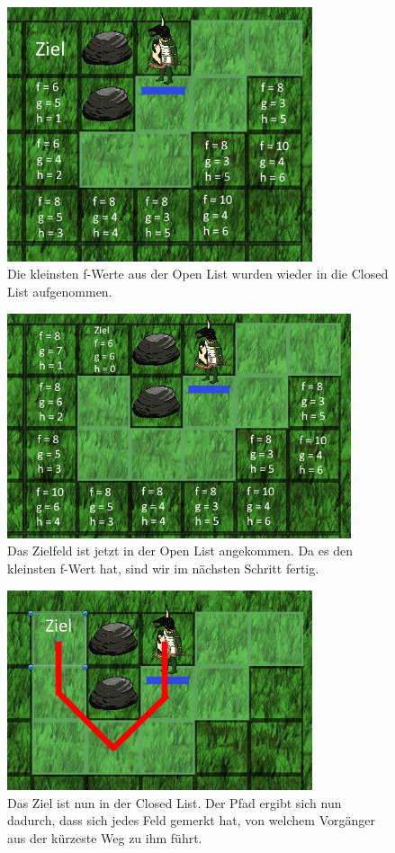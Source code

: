 \documentclass[extern,palatino]{cgBA}
\begin{document}
\begin{figure}[H]
	\centering
	\includegraphics[width=0.8\textwidth]{pathfinding3.png}
	\caption{Die kleinsten f-Werte aus der Open List wurden wieder in die Closed List aufgenommen.}
	\label{pathfinding3}
\end{figure}
\begin{figure}[H]
	\centering
	\includegraphics[width=0.9\textwidth]{pathfinding4.png}
	\caption{Das Zielfeld ist jetzt in der Open List angekommen. Da es den kleinsten f-Wert hat, sind wir im nächsten Schritt fertig.}
	\label{pathfinding4}
\end{figure}
\begin{figure}[H]
	\centering
	\includegraphics[width=0.8\textwidth]{pathfinding5.png}
	\caption{Das Ziel ist nun in der Closed List. Der Pfad ergibt sich nun dadurch, dass sich jedes Feld gemerkt hat, von welchem Vorgänger aus der kürzeste Weg zu ihm führt.}
	\label{pathfinding5}
\end{figure}
\newpage
\end{document}
